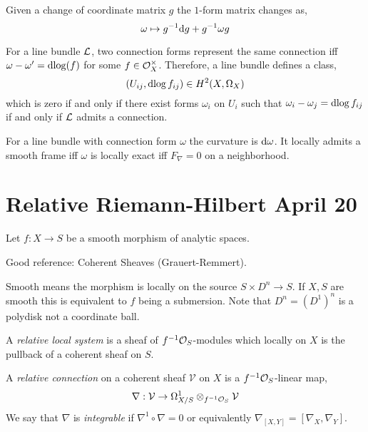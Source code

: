 \documentclass[12pt]{article}
\begin{document}
\begin{prop}
Given a change of coordinate matrix $g$ the $1$-form matrix changes as,
\[ \omega \mapsto g^{-1} \mathrm{d}{g} + g^{-1} \omega g \]
\end{prop} 

\begin{cor}
For a line bundle $\mathcal{L}$, two connection forms represent the same connection iff $\omega - \omega' = \mathrm{d}{\log}(f)$ for some $f \in \mathcal{O}_{X}^\times$. Therefore, a line bundle defines a class,
\[ (U_{ij}, \mathrm{d}{\log{f_{ij}}}) \in H^2(X, \Omega_X) \]
which is zero if and only if there exist forms $\omega_i$ on $U_i$ such that $\omega_i - \omega_j = \mathrm{d}{\log{f_{ij}}}$ if and only if $\mathcal{L}$ admits a connection. 
\end{cor}

\begin{prop}
For a line bundle with connection form $\omega$ the curvature is $\mathrm{d}{\omega}$. It locally admits a smooth frame iff $\omega$ is locally exact iff $F_\nabla = 0$ on a neighborhood.
\end{prop}

\section{Relative Riemann-Hilbert April 20}

Let $f : X \to S$ be a smooth morphism of analytic spaces. 

\begin{rmk}
Good reference: Coherent Sheaves (Grauert-Remmert). 
\end{rmk}

\begin{rmk}
Smooth means the morphism is locally on the source $S \times D^n \to S$. If $X,S$ are smooth this is equivalent to $f$ being a submersion. Note that $D^n = (D^1)^n$ is a polydisk not a coordinate ball. 
\end{rmk}

\begin{defn}
A \textit{relative local system} is a sheaf of $f^{-1} \mathcal{O}_{S}$-modules which locally on $X$ is the pullback of a coherent sheaf on $S$. 
\end{defn}

\newcommand{\cV}{\mathcal{V}}

\begin{defn}
A \textit{relative connection} on a coherent sheaf $\cV$ on $X$ is a $f^{-1} \mathcal{O}_{S}$-linear map,
\[ \nabla : \cV \to \Omega^1_{X/S} \ot_{f^{-1} \struct{S}} \cV \]
We say that $\nabla$ is \textit{integrable} if $\nabla^1 \circ \nabla = 0$ or equivalently $\nabla_{[X,Y]} = [\nabla_X, \nabla_Y]$. 
\end{defn}
\end{document}
